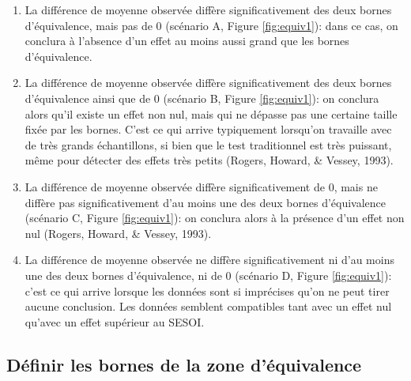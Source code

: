 \documentclass[
  12pt,
  french,
]{article}
\begin{document}
\begin{enumerate}
\def\labelenumi{(\arabic{enumi})}
\item
  La différence de moyenne observée diffère significativement des deux
  bornes d'équivalence, mais pas de 0 (scénario A, Figure
  \ref{fig:equiv1}): dans ce cas, on conclura à l'absence d'un effet au
  moins aussi grand que les bornes d'équivalence.
\item
  La différence de moyenne observée diffère significativement des deux
  bornes d'équivalence ainsi que de 0 (scénario B, Figure
  \ref{fig:equiv1}): on conclura alors qu'il existe un effet non nul,
  mais qui ne dépasse pas une certaine taille fixée par les bornes.
  C'est ce qui arrive typiquement lorsqu'on travaille avec de très
  grands échantillons, si bien que le test traditionnel est très
  puissant, même pour détecter des effets très petits (Rogers, Howard,
  \& Vessey, 1993).
\item
  La différence de moyenne observée diffère significativement de 0, mais
  ne diffère pas significativement d'au moins une des deux bornes
  d'équivalence (scénario C, Figure \ref{fig:equiv1}): on conclura alors
  à la présence d'un effet non nul (Rogers, Howard, \& Vessey, 1993).
\item
  La différence de moyenne observée ne diffère significativement ni d'au
  moins une des deux bornes d'équivalence, ni de 0 (scénario D, Figure
  \ref{fig:equiv1}): c'est ce qui arrive lorsque les données sont si
  imprécises qu'on ne peut tirer aucune conclusion. Les données semblent
  compatibles tant avec un effet nul qu'avec un effet supérieur au
  SESOI.
\end{enumerate}

\hypertarget{duxe9finir-les-bornes-de-la-zone-duxe9quivalence}{%
\subsection{Définir les bornes de la zone
d'équivalence}\label{duxe9finir-les-bornes-de-la-zone-duxe9quivalence}}
\end{document}
